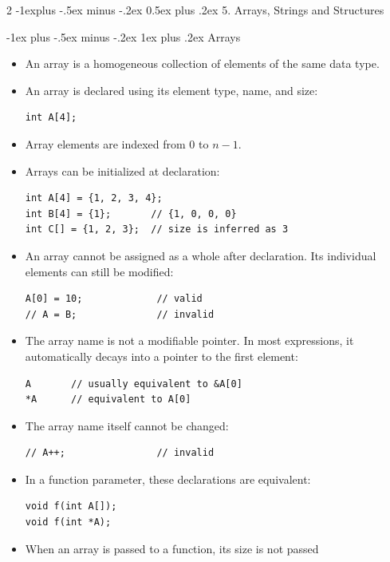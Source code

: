 \documentclass[10pt, portrait]{article}
\makeatletter
\renewcommand{\section}{\@startsection{section}{1}{0mm}%
                                {-1ex plus -.5ex minus -.2ex}%
                                {0.5ex plus .2ex}%
                                {\normalfont\large\bfseries}}
\renewcommand{\section}{\@startsection{section}{2}{0mm}%
                                {-1explus -.5ex minus -.2ex}%
                                {0.5ex plus .2ex}%
                                {\normalfont\normalsize\bfseries}}
\renewcommand{\subsection}{\@startsection{subsection}{3}{0mm}%
                                {-1ex plus -.5ex minus -.2ex}%
                                {1ex plus .2ex}%
                                {\normalfont\small\bfseries}}%
\makeatother
\begin{document}
\begin{multicols*}{2}
\section{5. Arrays, Strings and Structures}

\subsection{Arrays}

\begin{itemize}
    \item An array is a homogeneous collection of elements of the same data type.
    \item An array is declared using its element type, name, and size:
    \begin{verbatim}
int A[4];
    \end{verbatim}
    \item Array elements are indexed from 0 to $n-1$.
    \item Arrays can be initialized at declaration:
    \begin{verbatim}
int A[4] = {1, 2, 3, 4};
int B[4] = {1};       // {1, 0, 0, 0}
int C[] = {1, 2, 3};  // size is inferred as 3
    \end{verbatim}
    \item An array cannot be assigned as a whole after declaration. Its
    individual elements can still be modified:
    \begin{verbatim}
A[0] = 10;             // valid
// A = B;              // invalid
    \end{verbatim}
    \item The array name is not a modifiable pointer. In most expressions,
    it automatically decays into a pointer to the first element:
    \begin{verbatim}
A       // usually equivalent to &A[0]
*A      // equivalent to A[0]
    \end{verbatim}
    \item The array name itself cannot be changed:
    \begin{verbatim}
// A++;                // invalid
    \end{verbatim}
    \item In a function parameter, these declarations are equivalent:
    \begin{verbatim}
void f(int A[]);
void f(int *A);
    \end{verbatim}
    \item When an array is passed to a function, its size is not passed

\end{itemize}
\end{multicols*}
\end{document}

